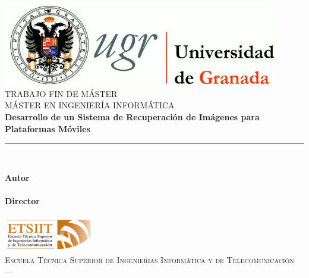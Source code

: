 \begin{titlepage}
 
 
\newlength{\centeroffset}
\setlength{\centeroffset}{-0.5\oddsidemargin}
\addtolength{\centeroffset}{0.5\evensidemargin}

\noindent\hspace*{\centeroffset}\begin{minipage}{\textwidth}

\centering
\includegraphics[width=0.9\textwidth]{imagenes/logo_ugr.jpg}\\[1.4cm]

\textsc{ \Large TRABAJO FIN DE MÁSTER\\[0.2cm]}
\textsc{ MÁSTER EN INGENIERÍA INFORMÁTICA}\\[1cm]
% 
{\Huge\scalebox{.2}\bfseries Desarrollo de un Sistema de Recuperación de Imágenes para Plataformas Móviles
\\
}
\noindent\rule[-1ex]{\textwidth}{3pt}\\[3.5ex]

\end{minipage}

\vspace{2.5cm}
\noindent\hspace*{\centeroffset}\begin{minipage}{\textwidth}
\centering

\textbf{Autor}\\ {\myName}\\[2.5ex]
\textbf{Director}\\
{\myProf}\\[2cm]
\includegraphics[width=0.3\textwidth]{imagenes/etsiit_logo.png}\\[0.1cm]
\textsc{Escuela Técnica Superior de Ingenierías Informática y de Telecomunicación}\\
\textsc{---}\\
\end{minipage}
\end{titlepage}


